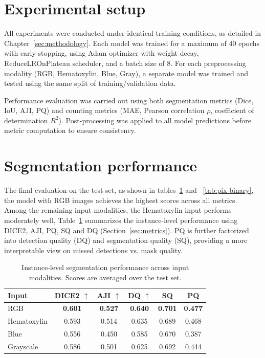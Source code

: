 \documentclass[target=bach,aauheader=,style=]{thud}
\begin{document}
\section{Experimental setup}
All experiments were conducted under identical training conditions, as detailed in Chapter~\ref{sec:methodology}. 
Each model was trained for a maximum of 40 epochs with early stopping, using Adam optimizer with weight decay, ReduceLROnPlateau scheduler, and a batch size of 8. 
For each preprocessing modality (RGB, Hematoxylin, Blue, Gray), a separate model was trained and tested using the same split of training/validation data.

Performance evaluation was carried out using both segmentation metrics (Dice, IoU, AJI, PQ) and counting metrics (MAE, Pearson correlation $\rho$, coefficient of determination $R^2$). 
Post-processing was applied to all model predictions before metric computation to ensure consistency.

\section{Segmentation performance}

The final evaluation on the test set, as shown in tables~\ref{tab:iou-results} and ~\ref{tab:pix-binary}, the model with RGB images achieves the highest scores across all metrics.\\
Among the remaining input modalities, the Hematoxylin input performs moderately well,  
Table~\ref{tab:iou-results}  summarizes the instance-level performance using DICE2, AJI, PQ, SQ and DQ (Section~\ref{sec:metrics}). 
PQ is further factorized into detection quality (DQ) and segmentation quality (SQ), providing a more interpretable view on missed detections vs. mask quality.

\begin{table}[ht]
\centering
\caption{Instance-level segmentation performance across input modalities. Scores are averaged over the test set.}
\label{tab:iou-results}
\small
\begin{tabular}{lccccc}
\toprule
\textbf{Input} & \textbf{DICE2} $\uparrow$ & \textbf{AJI} $\uparrow$ & \textbf{DQ} $\uparrow$ & \textbf{SQ} & \textbf{PQ}\\
\midrule
RGB         & \textbf{0.601} & \textbf{0.527} & \textbf{0.640} & \textbf{0.701} & \textbf{0.477}\\
Hematoxylin & 0.593 & 0.514 & 0.635 & 0.689 & 0.468\\
Blue        & 0.556 & 0.450 & 0.585 & 0.670 & 0.387\\
Grayscale   & 0.586 & 0.501 & 0.625 & 0.692 & 0.444\\
\bottomrule
\end{tabular}
\end{table}
\end{document}
